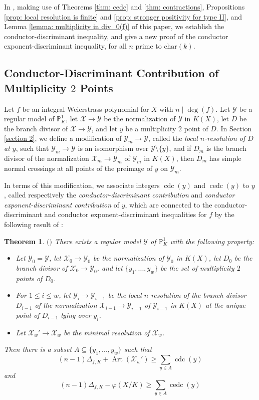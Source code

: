 \documentclass[12pt]{amsart}
\numberwithin{equation}{section}
\newtheorem{theorem}[equation]{Theorem}
\theoremstyle{definition}
\renewcommand{\P}{\mathbb P}
\renewcommand{\phi}{\varphi}
\newcommand{\X}{\mathcal{X}}
\newcommand{\Y}{\mathcal{Y}}
\newcommand{\tx}[1]{\text{#1}}
\DeclareMathOperator{\Art}{Art}
\DeclareMathOperator{\cdc}{cdc}
\DeclareMathOperator{\cedc}{cedc}
\begin{document}
In \cite{Part1}, making use of Theorems \ref{thm: cedc} and \ref{thm: contractions}, Propositions \ref{prop: local resolution is finite} and \ref{prop: stronger positivity for type II}, and Lemma \ref{lemma: multiplicity in div_0(f)} of this paper, we establish the conductor-discriminant inequality, and give a new proof of the conductor exponent-discriminant inequality, for all $n$ prime to $\tx{char}(k)$.

\subsection{Conductor-Discriminant Contribution of Multiplicity $2$ Points}\hfill

Let $f$ be an integral Weierstrass polynomial for $X$ with $n\mid\deg(f)$. Let $\Y$ be a regular model of $\P^1_K$, let $\X\to\Y$ be the normalization of $\Y$ in $K(X)$, let $D$ be the branch divisor of $\X\to\Y$, and let $y$ be a multiplicity $2$ point of $D$. In Section \ref{section 2}, we define a modification of $\Y_m\to\Y$, called the \textit{local $n$-resolution of $D$ at $y$}, such that $\Y_m\to\Y$ is an isomorphism over $\Y\setminus\{y\}$, and if $D_m$ is the branch divisor of the normalization $\X_m\to\Y_m$ of $\Y_m$ in $K(X)$, then $D_m$ has simple normal crossings at all points of the preimage of $y$ on $\Y_m$.

In terms of this modification, we associate integers $\cdc(y)$ and $\cedc(y)$ to $y$, called respectively the \textit{conductor-discriminant contribution} and \textit{conductor exponent-discriminant contribution} of $y$, which are connected to the conductor-discriminant and conductor exponent-discriminant inequalities for $f$ by the following result of \cite{Part1}:

\begin{theorem}\label{thm: reduction to cdc} $($\cite[Proposition 10.9]{Part1}$)$
    There exists a regular model $\Y$ of $\P^1_K$ with the following property:
    \begin{itemize}
        \item Let $\Y_0=\Y$, let $\X_0\to\Y_0$ be the normalization of $\Y_0$ in $K(X)$, let $D_0$ be the branch divisor of $\X_0\to\Y_0$, and let $\{y_1,...,y_w\}$ be the set of multiplicity $2$ points of $D_0$.
        \item For $1\leq i\leq w$, let $\Y_i\to\Y_{i-1}$ be the local $n$-resolution of the branch divisor $D_{i-1}$ of the normalization $\X_{i-1}\to\Y_{i-1}$ of $\Y_{i-1}$ in $K(X)$ at the unique point of $D_{i-1}$ lying over $y_i$.
        \item Let $\X_w'\to\X_w$ be the minimal resolution of $\X_w$.
    \end{itemize}
    Then there is a subset $A\subseteq\{y_1,...,y_w\}$ such that
    \[(n-1)\Delta_{f,K}+\Art(\X_w')\geq\sum_{y\in A}\cdc(y)\]
    and
    \[(n-1)\Delta_{f,K}-\phi(X/K)\geq\sum_{y\in A}\cedc(y)\]  
\end{theorem}  
\end{document}
